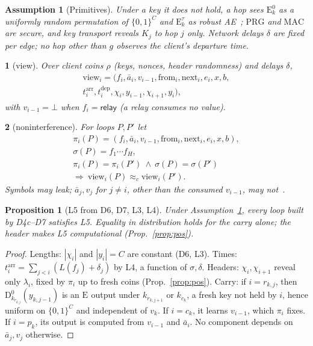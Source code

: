 \documentclass[journal]{IEEEtran}
\newtheorem{assumption}{Assumption}
\newtheorem{proposition}{Proposition}
\newcommand{\namedhead}{}
\newtheorem*{namedenv}{\namedhead}
\newenvironment{defD}[2]{\renewcommand{\namedhead}{Definition #1}%
  \begin{namedenv}[#2]}{\end{namedenv}}
\newenvironment{lawL}[2]{\renewcommand{\namedhead}{Law #1}%
  \begin{namedenv}[#2]}{\end{namedenv}}
\newcommand{\relay}{\mathsf{relay}}
\newcommand{\Enc}[2]{\mathrm{E}^{#1}_{#2}}
\newcommand{\Dec}[2]{\mathrm{D}^{#1}_{#2}}
\newcommand{\view}{\mathrm{view}}
\newcommand{\nxt}{\mathrm{next}}
\newcommand{\frm}{\mathrm{from}}
\newcommand{\arr}{t^{\mathrm{arr}}}
\newcommand{\dep}{t^{\mathrm{dep}}}
\newcommand{\eqc}{\approx_{c}}
\newcommand{\PRG}{\mathrm{PRG}}
\newcommand{\MAC}{\mathrm{MAC}}
\begin{document}
\begin{assumption}[Primitives]\label{as:prim}
Under a key it does not hold, a hop sees $\Enc{0}{k}$ as a uniformly random
permutation of $\{0,1\}^{C}$ and $\Enc{\tau}{k}$ as robust
AE~\cite{Hoang2015}; $\PRG$ and $\MAC$ are secure, and key transport
reveals $K_j$ to hop $j$ only.  Network delays $\delta$ are fixed per edge;
no hop other than $g$ observes the client's departure time.
\end{assumption}

\begin{defD}{D9}{view}
Over client coins $\rho$ (keys, nonces, header randomness) and delays
$\delta$,
\begin{multline*}
\view_i=(f_i,\bar a_i,v_{i-1},\frm_i,\nxt_i,e_i,x,b,\\
\arr_i,\dep_i,\chi_i,y_{i-1},\chi_{i+1},y_i),
\end{multline*}
with $v_{i-1}=\bot$ when $f_i=\relay$ (a relay consumes no value).
\end{defD}

\begin{lawL}{L5}{noninterference}
For loops $P,P'$ let
\begin{gather*}
\pi_i(P)=(f_i,\bar a_i,v_{i-1},\frm_i,\nxt_i,e_i,x,b),\\
\sigma(P)=f_1\cdots f_H,\\
\pi_i(P)=\pi_i(P')\ \wedge\ \sigma(P)=\sigma(P')\\
\Rightarrow\ \view_i(P)\eqc\view_i(P') .
\end{gather*}
Symbols may leak; $\bar a_j,v_j$ for $j\ne i$, other than the consumed
$v_{i-1}$, may not~\cite{Goguen1982}.
\end{lawL}

\begin{proposition}[L5 from D6, D7, L3, L4]\label{prop:ni}
Under Assumption~\ref{as:prim}, every loop built by
D4c--D7 satisfies L5.  Equality in distribution holds for the carry
alone; the header makes L5 computational (Prop.~\ref{prop:pos}).
\end{proposition}
\begin{proof}
Lengths: $|\chi_i|$ and $|y_i|=C$ are constant (D6, L3).  Times:
$\arr_i=\sum_{j<i}(L(f_j)+\delta_j)$ by L4, a function of $\sigma,\delta$.
Headers: $\chi_i,\chi_{i+1}$ reveal only $\lambda_i$, fixed by $\pi_i$ up
to fresh coins (Prop.~\ref{prop:pos}).  Carry: if $i=r_{k,j}$, then
$\Dec{0}{k_{r_{k,j}}}(y_{k,j-1})$ is an $\Enc{}{}$ output under
$k_{r_{k,j+1}}$ or $k_{c_k}$, a fresh key not held by $i$, hence uniform on
$\{0,1\}^C$ and independent of $v_k$.  If $i=c_k$, it learns $v_{i-1}$,
which $\pi_i$ fixes.  If $i=p_k$, its output is computed from $v_{i-1}$
and $\bar a_i$.  No component depends on $\bar a_j,v_j$ otherwise.
\end{proof}
\end{document}
